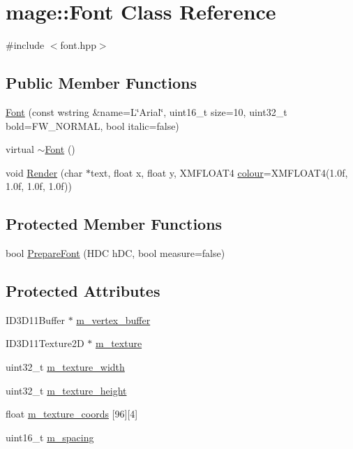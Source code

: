 \hypertarget{classmage_1_1_font}{}\section{mage\+:\+:Font Class Reference}
\label{classmage_1_1_font}


{\ttfamily \#include $<$font.\+hpp$>$}

\subsection*{Public Member Functions}
\begin{DoxyCompactItemize}
\item 
\hyperlink{classmage_1_1_font_a10cc7123d8afdea0d092467b44dc7b66}{Font} (const wstring \&name=L\char`\"{}Arial\char`\"{}, uint16\+\_\+t size=10, uint32\+\_\+t bold=F\+W\+\_\+\+N\+O\+R\+M\+AL, bool italic=false)
\item 
virtual \hyperlink{classmage_1_1_font_a4aca7ada98c96fd3de2ecd98c82ae6a8}{$\sim$\+Font} ()
\item 
void \hyperlink{classmage_1_1_font_a1be5ae8a4da06d84081fde478df7fd0e}{Render} (char $\ast$text, float x, float y, X\+M\+F\+L\+O\+A\+T4 \hyperlink{namespacemage_a2d4dece8fe175b32167f9a7b925adc7c}{colour}=X\+M\+F\+L\+O\+A\+T4(1.\+0f, 1.\+0f, 1.\+0f, 1.\+0f))
\end{DoxyCompactItemize}
\subsection*{Protected Member Functions}
\begin{DoxyCompactItemize}
\item 
bool \hyperlink{classmage_1_1_font_a4cbf910a292f2957b43fd4060db6aba4}{Prepare\+Font} (H\+DC h\+DC, bool measure=false)
\end{DoxyCompactItemize}
\subsection*{Protected Attributes}
\begin{DoxyCompactItemize}
\item 
I\+D3\+D11\+Buffer $\ast$ \hyperlink{classmage_1_1_font_aa22cbecaebb02a21eb07d0fe0ca0eed4}{m\+\_\+vertex\+\_\+buffer}
\item 
I\+D3\+D11\+Texture2D $\ast$ \hyperlink{classmage_1_1_font_a4ccec8d9d3e29b3ef307b8111084c9b8}{m\+\_\+texture}
\item 
uint32\+\_\+t \hyperlink{classmage_1_1_font_ab74c50dc44037c95c7a568c9695d520b}{m\+\_\+texture\+\_\+width}
\item 
uint32\+\_\+t \hyperlink{classmage_1_1_font_afcc7dba6d0991eca65a32d55b6cba503}{m\+\_\+texture\+\_\+height}
\item 
float \hyperlink{classmage_1_1_font_a6b03de184fbf6fa4e663d711e86656f0}{m\+\_\+texture\+\_\+coords} \mbox{[}96\mbox{]}\mbox{[}4\mbox{]}
\item 
uint16\+\_\+t \hyperlink{classmage_1_1_font_adf5b07b3d91d4dc84e92c3e997ec3d13}{m\+\_\+spacing}
\end{DoxyCompactItemize}


